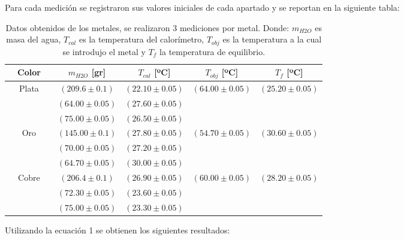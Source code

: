\documentclass[a4paper]{article}
\begin{document}
Para cada medición se registraron sus valores iniciales de cada apartado y se reportan en la siguiente tabla:
\begin{table}[H]
\begin{center}
\begin{tabular}{|ccc|c|c|c|c|} \hline
  & Color  &  & $m_{H2O}$ [gr] & $T_{cal}$ [ºC] & $T_{obj}$ [ºC] & $T_f$ [ºC] \\
    \hline
    \multicolumn{3}{|c|}{\multirow{3}{*}{Plata}} & $(209.6\pm0.1)$ & $(22.10\pm0.05)$ & $(64.00\pm0.05)$ & $(25.20\pm0.05)$\\ \cline{4-7}
    \multicolumn{3}{|c|}{}& $(209.6\pm0.1) $ & $(24.90\pm0.05)$ &  $(64.00\pm0.05)$ & $(27.60\pm0.05)$ \\ \cline{4-7}
    \multicolumn{3}{|c|}{}& $(233.6\pm0.1)$ & $(23.70\pm0.05)$ & $(75.00\pm0.05)$ & $(26.50\pm0.05)$\\
    \hline
    \multicolumn{3}{|c|}{\multirow{3}{*}{Oro}}& $(145.00\pm0.1)$ & $(27.80\pm0.05)$ & $(54.70\pm0.05)$ & $(30.60\pm0.05)$\\ \cline{4-7}
    \multicolumn{3}{|c|}{}& $(238.50\pm0.1)$ & $(23.30\pm0.05)$ & $(70.00\pm0.05)$ & $(27.20\pm0.05)$\\ \cline{4-7}
    \multicolumn{3}{|c|}{}& $(237.30\pm0.1)$ & $(27.00\pm0.05)$ & $(64.70\pm0.05)$ & $(30.00\pm0.05)$\\
    \hline
    \multicolumn{3}{|c|}{\multirow{3}{*}{Cobre}}& $(206.4\pm0.1)$ & $(26.90\pm0.05)$ & $(60.00\pm0.05)$ & $(28.20\pm0.05)$\\ \cline{4-7}
    \multicolumn{3}{|c|}{}& $(234.4\pm0.1)$ & $(22.20\pm0.05)$ & $(72.30\pm0.05)$ & $(23.60\pm0.05)$\\ \cline{4-7}
    \multicolumn{3}{|c|}{}& $(239.3\pm0.1)$ & $(23.00\pm0.05)$ & $(75.00\pm0.05)$ & $(23.30\pm0.05)$\\
    \hline
\end{tabular}
\end{center}
\label{tab:multicol}
\caption{Datos obtenidos de los metales, se realizaron 3 mediciones por metal. Donde: $m_{H2O}$ es masa del agua, $T_{cal}$ es la temperatura del calorímetro, $T_{obj}$ es la temperatura a la cual se introdujo el metal y $T_f$ la temperatura de equilibrio.}
\end{table}

Utilizando la ecuación 1 se obtienen los siguientes resultados:
\end{document}
